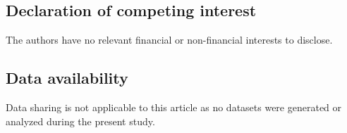\documentclass[preprint,11pt]{elsarticle}
\begin{document}
\subsection*{Declaration of competing interest}
The authors have no relevant financial or non-financial interests to disclose.

\subsection*{Data availability}
Data sharing is not applicable to this article as no datasets were generated or analyzed 
during the present study.



\end{document}
